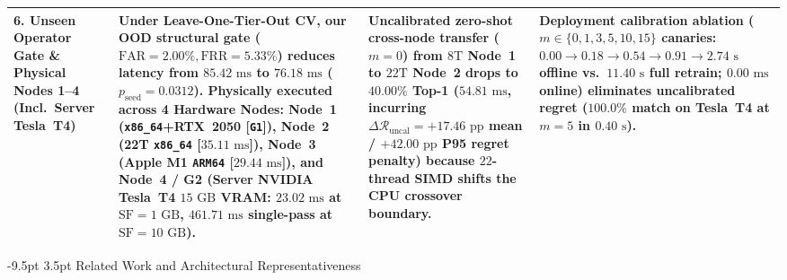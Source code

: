 \documentclass[10pt,a4paper]{article}
\makeatletter
\newenvironment{fitasttable}{%
  \begin{lrbox}{\asttblbox}%
}{%
  \end{lrbox}%
  \sbox{\asttblboxB}{%
    \ifdim\wd\asttblbox>0.96\textwidth
      \resizebox{0.96\textwidth}{!}{\usebox{\asttblbox}}%
    \else
      \usebox{\asttblbox}%
    \fi
  }%
  \ifdim\ht\asttblboxB>0.72\textheight
    \resizebox{!}{0.72\textheight}{\usebox{\asttblboxB}}%
  \else
    \usebox{\asttblboxB}%
  \fi
}
\renewcommand\section{\@startsection{section}{1}{\z@}%
  {-9.5pt \@plus -2pt \@minus -1.5pt}%
  {3.5pt \@plus 1pt}%
  {\normalfont\large\bfseries}}
\makeatother
\begin{document}
\begin{table}[!htbp]
{\begin{fitasttable}
\begin{tabular}{@{}p{2.6cm}p{4.6cm}p{4.3cm}p{4.5cm}@{}}
\textbf{6. Unseen Operator Gate \& Physical Nodes 1--4 (Incl.\ Server Tesla~T4)} & Under Leave-One-Tier-Out CV, our OOD structural gate ($\text{FAR}=2.00\%, \text{FRR}=5.33\%$) reduces latency from $85.42\text{ ms}$ to $76.18\text{ ms}$ ($p_{\text{seed}}=0.0312$). Physically executed across \textbf{4 Hardware Nodes}: Node~1 (\texttt{x86\_64}+RTX~2050 [\texttt{G1}]), Node~2 (22T \texttt{x86\_64} [$35.11\text{ ms}$]), Node~3 (Apple M1 \texttt{ARM64} [$29.44\text{ ms}$]), and \textbf{Node~4 / G2 (Server NVIDIA Tesla~T4 $15\text{ GB}$ VRAM: $23.02\text{ ms}$ at $\text{SF}=1\text{ GB}$, $461.71\text{ ms}$ single-pass at $\text{SF}=10\text{ GB}$)}. & Uncalibrated zero-shot cross-node transfer ($m=0$) from $8\text{T}$ Node~1 to $22\text{T}$ Node~2 drops to $40.00\%$ Top-1 ($54.81\text{ ms}$, incurring $\Delta\mathcal{R}_{\text{uncal}}=+17.46\text{ pp}$ mean / $+42.00\text{ pp}$ P95 regret penalty) because $22$-thread SIMD shifts the CPU crossover boundary. & Deployment calibration ablation ($m\in\{0,1,3,5,10,15\}$ canaries: $0.00\rightarrow 0.18\rightarrow 0.54\rightarrow 0.91\rightarrow 2.74\text{ s}$ offline vs.\ $11.40\text{ s}$ full retrain; $0.00\text{ ms}$ online) eliminates uncalibrated regret ($100.0\%$ match on Tesla~T4 at $m=5$ in $0.40\text{ s}$). \\
\bottomrule
\end{tabular}
\end{fitasttable}
}
\end{table}

\section{Related Work and Architectural Representativeness}
\end{document}

